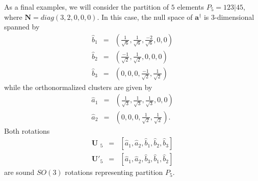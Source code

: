\documentclass[twocolumn,aps,sort,nofootinbib]{revtex4}
\begin{document}
As a final examples, we will consider the partition of $5$ elements
$P_5=123|45$, where $\mathbf{N}=diag(3,2,0,0,0)$. In this case, 
the null space of 
$\mathbf{a}^\dagger$ is $3$-dimensional spanned by
\begin{eqnarray} 
\hat{b}_1 &=& (\frac{1}{\sqrt{6}},\frac{1}{\sqrt{6}},\frac{-2}{\sqrt{6}},0,0) \nonumber \\
\hat{b}_2 &=& (\frac{-1}{\sqrt{2}},\frac{1}{\sqrt{2}},0,0,0) \\
\hat{b}_3 &=& (0,0,0,\frac{-1}{\sqrt{2}},\frac{1}{\sqrt{2}}) \nonumber
\end{eqnarray}
while the orthonormalized clusters are given by
\begin{eqnarray}
\hat{a}_1 &=& (\frac{1}{\sqrt{3}},\frac{1}{\sqrt{3}},\frac{1}{\sqrt{3}},0,0) \nonumber\\
\hat{a}_2 &=& (0,0,0,\frac{1}{\sqrt{2}},\frac{1}{\sqrt{2}}).
\end{eqnarray}
Both rotations 
\begin{eqnarray}
\mathbf{U\phantom{'}}_5 &=& [\hat{a}_1,\hat{a}_2,\hat{b}_1,\hat{b}_2,\hat{b}_3] \\
\mathbf{U'}_5 &=& [\hat{a}_1,\hat{a}_2,\hat{b}_3,\hat{b}_1,\hat{b}_2] 
\end{eqnarray}
are sound $SO(3)$ rotations representing partition $P_5$.

\phantom{a}
\end{document}
